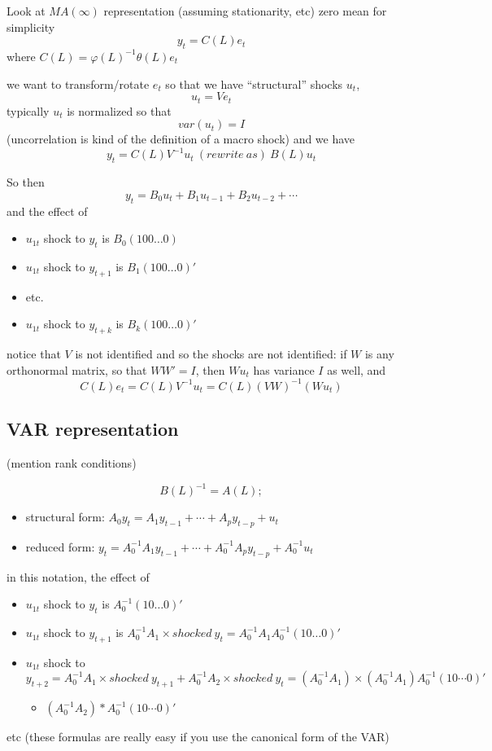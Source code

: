 Look at $MA(∞)$ representation (assuming stationarity, etc) zero mean
for simplicity \[y_t = C(L) e_t\] where $C(L) = φ(L)^{-1} θ(L) e_t$

we want to transform/rotate $e_t$ so that we have ``structural''
shocks $u_t$,
\[u_t = V e_t\] typically $u_t$ is normalized so that
\[var( u_t ) = I\] (uncorrelation is kind of the definition of a macro
shock) and we have
\[y_t = C(L) V^{-1} u_t\ (rewrite\ as)\ B(L) u_t\]

So then
\[y_t = B_0 u_t + B_1 u_{t-1} + B_2 u_{t-2} + ⋯\]
and the effect of
\begin{itemize}
\item $u_{1t}$ shock to $y_t$ is $B_0 (1 0 0 … 0)$
\item $u_{1t}$ shock to $y_{t+1}$ is $B_1 (1 0 0 … 0)'$
\item etc.
\item $u_{1t}$ shock to $y_{t+k}$ is $B_k (1 0 0 … 0)'$
\end{itemize}
notice that $V$ is not identified and so the shocks are not identified:
if $W$ is any orthonormal matrix, so that $W W' = I$, then $W u_t$ has
variance $I$ as well, and
\[C(L) e_t = C(L) V^{-1} u_t = C(L) (VW)^{-1} ( W u_t )\]

\subsection{VAR representation}

(mention rank conditions)

\[B(L)^{-1} = A(L);\]
\begin{itemize}
\item structural form: $A_0 y_t = A_1 y_{t-1} + ⋯ + A_p y_{t-p} + u_t$
\item reduced form: $y_t = A_0^{-1} A_1 y_{t-1} + ⋯ + A_0^{-1} A_p
  y_{t-p} + A_0^{-1} u_t$
\end{itemize}
in this notation, the effect of
\begin{itemize}
\item $u_{1t}$ shock to $y_t$ is $A_0^{-1} (1 0 … 0)'$
\item $u_{1t}$ shock to $y_{t+1}$ is $A_0^{-1} A_1 × shocked\ y_t =
  A_0^{-1} A_1 A_0^{-1} (1 0 … 0)'$
\item $u_{1t}$ shock to $y_{t+2} = A_0^{-1} A_1 × shocked\ y_{t+1} +
  A_0^{-1} A_2 × shocked\ y_t = (A_0^{-1} A_1) × (A_0^{-1} A_1)
  A_0^{-1} (1 0 ⋯ 0)'$
  \begin{itemize}
  \item $(A_0^{-1} A_2) * A_0^{-1} (1 0 ⋯ 0)'$
  \end{itemize}
\end{itemize}
etc (these formulas are really easy if you use the canonical form of
the VAR)

